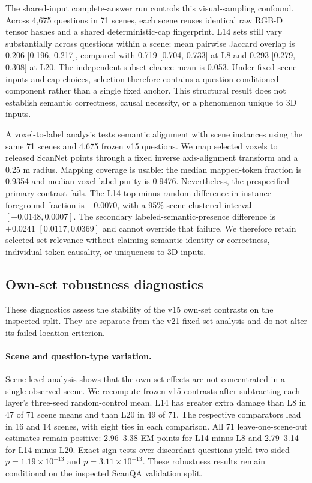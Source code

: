 The shared-input complete-answer run controls this visual-sampling confound. Across 4,675 questions in 71 scenes, each scene reuses identical raw RGB-D tensor hashes and a shared deterministic-cap fingerprint. L14 sets still vary substantially across questions within a scene: mean pairwise Jaccard overlap is 0.206 [0.196, 0.217], compared with 0.719 [0.704, 0.733] at L8 and 0.293 [0.279, 0.308] at L20. The independent-subset chance mean is 0.053. Under fixed scene inputs and cap choices, selection therefore contains a question-conditioned component rather than a single fixed anchor. This structural result does not establish semantic correctness, causal necessity, or a phenomenon unique to 3D inputs.

A voxel-to-label analysis tests semantic alignment with scene instances using the same 71 scenes and 4,675 frozen v15 questions. We map selected voxels to released ScanNet points through a fixed inverse axis-alignment transform and a 0.25 m radius. Mapping coverage is usable: the median mapped-token fraction is 0.9354 and median voxel-label purity is 0.9476. Nevertheless, the prespecified primary contrast fails. The L14 top-minus-random difference in instance foreground fraction is $-0.0070$, with a 95\% scene-clustered interval $[-0.0148,0.0007]$. The secondary labeled-semantic-presence difference is $+0.0241$ $[0.0117,0.0369]$ and cannot override that failure. We therefore retain selected-set relevance without claiming semantic identity or correctness, individual-token causality, or uniqueness to 3D inputs.

\subsection{Own-set robustness diagnostics}
These diagnostics assess the stability of the v15 own-set contrasts on the inspected split. They are separate from the v21 fixed-set analysis and do not alter its failed location criterion.

\paragraph{Scene and question-type variation.} Scene-level analysis shows that the own-set effects are not concentrated in a single observed scene. We recompute frozen v15 contrasts after subtracting each layer's three-seed random-control mean. L14 has greater extra damage than L8 in 47 of 71 scene means and than L20 in 49 of 71. The respective comparators lead in 16 and 14 scenes, with eight ties in each comparison. All 71 leave-one-scene-out estimates remain positive: 2.96--3.38 EM points for L14-minus-L8 and 2.79--3.14 for L14-minus-L20. Exact sign tests over discordant questions yield two-sided $p=1.19\times10^{-13}$ and $p=3.11\times10^{-13}$. These robustness results remain conditional on the inspected ScanQA validation split.

